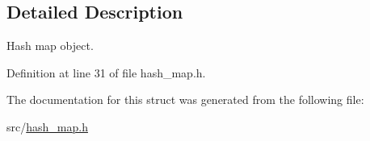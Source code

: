 \subsection{Detailed Description}
Hash map object. 

Definition at line 31 of file hash\-\_\-map.\-h.



The documentation for this struct was generated from the following file\-:\begin{DoxyCompactItemize}
\item 
src/\hyperlink{hash__map_8h}{hash\-\_\-map.\-h}\end{DoxyCompactItemize}
